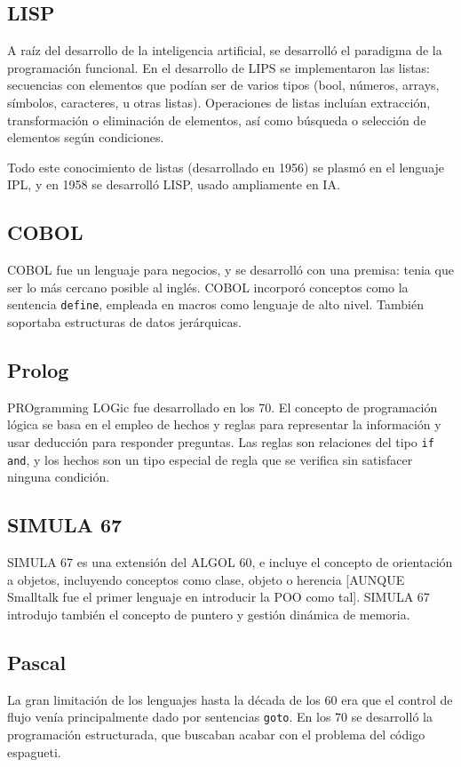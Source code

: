 \documentclass[a4paper]{article}
\begin{document}
	\subsection{LISP}
	 A raíz del desarrollo de la inteligencia artificial, se desarrolló el paradigma de la programación funcional. En el desarrollo de LIPS se implementaron las listas: secuencias con elementos que podían ser de varios tipos (bool, números, arrays, símbolos, caracteres, u otras listas). Operaciones de listas incluían extracción, transformación o eliminación de elementos, así como búsqueda o selección de elementos según condiciones.
	 
	 Todo este conocimiento de listas (desarrollado en 1956) se plasmó en el lenguaje IPL, y en 1958 se desarrolló LISP, usado ampliamente en IA.
	 
	 \subsection{COBOL}
	 COBOL fue un lenguaje para negocios, y se desarrolló con una premisa: tenia que ser lo más cercano posible al inglés. COBOL incorporó conceptos como la sentencia \verb|define|, empleada en macros como lenguaje de alto nivel. También soportaba estructuras de datos jerárquicas.
	 
	 \subsection{Prolog}
	 PROgramming LOGic fue desarrollado en los 70. El concepto de programación lógica se basa en el empleo de hechos y reglas para representar la información y usar deducción para responder preguntas. Las reglas son relaciones del tipo \verb|if and|, y los hechos son un tipo especial de regla que se verifica sin satisfacer ninguna condición.
	 
	 \subsection{SIMULA 67}
	 SIMULA 67 es una extensión del ALGOL 60, e incluye el concepto de orientación a objetos, incluyendo conceptos como clase, objeto o herencia [AUNQUE Smalltalk fue el primer lenguaje en introducir la POO como tal]. SIMULA 67 introdujo también el concepto de puntero y gestión dinámica de memoria.
	 
	 \subsection{Pascal}
	 La gran limitación de los lenguajes hasta la década de los 60 era que el control de flujo venía principalmente dado por sentencias \verb|goto|. En los 70 se desarrolló la programación estructurada, que buscaban acabar con el problema del código espagueti. 
	 
\end{document}
